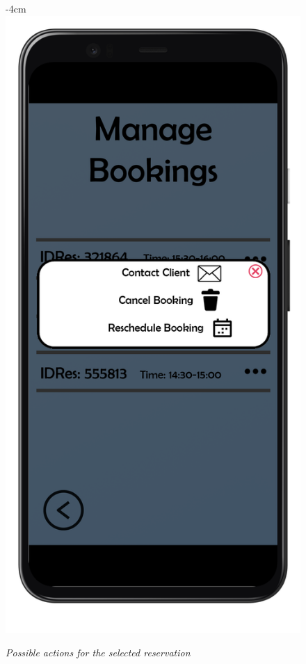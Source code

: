 \documentclass{article}
\begin{document}
			\begin{figure}[H]
				\begin{adjustwidth} {-4cm}{}
					\centering
					\includegraphics[scale=0.45]{../Mockups/MBpopup.png}\\
				\end{adjustwidth}
				\caption{\emph{Possible actions for the selected reservation}}
			\end{figure}
		
\end{document}
